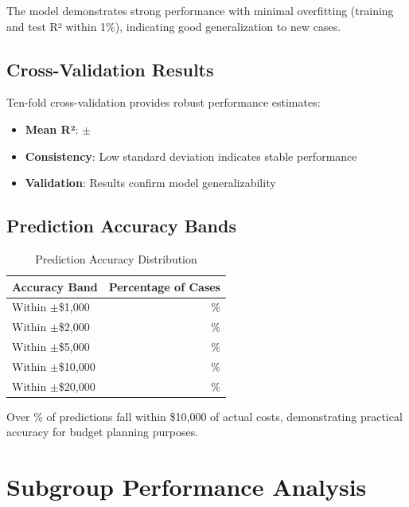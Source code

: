 The model demonstrates strong performance with minimal overfitting (training and test R² within 1\%), indicating good generalization to new cases.

\subsection{Cross-Validation Results}

Ten-fold cross-validation provides robust performance estimates:
\begin{itemize}
    \item \textbf{Mean R²}: \ModelThreeCVMean{} $\pm$ \ModelThreeCVStd{}
    \item \textbf{Consistency}: Low standard deviation indicates stable performance
    \item \textbf{Validation}: Results confirm model generalizability
\end{itemize}

\subsection{Prediction Accuracy Bands}

\begin{table}[h]
\centering
\caption{Prediction Accuracy Distribution}
\begin{tabular}{lr}
\toprule
\textbf{Accuracy Band} & \textbf{Percentage of Cases} \\
\midrule
Within $\pm$\$1,000 & \ModelThreeWithinOneK{}\% \\
Within $\pm$\$2,000 & \ModelThreeWithinTwoK{}\% \\
Within $\pm$\$5,000 & \ModelThreeWithinFiveK{}\% \\
Within $\pm$\$10,000 & \ModelThreeWithinTenK{}\% \\
Within $\pm$\$20,000 & \ModelThreeWithinTwentyK{}\% \\
\bottomrule
\end{tabular}
\end{table}

Over \ModelThreeWithinTenK{}\% of predictions fall within \$10,000 of actual costs, demonstrating practical accuracy for budget planning purposes.

\section{Subgroup Performance Analysis}

